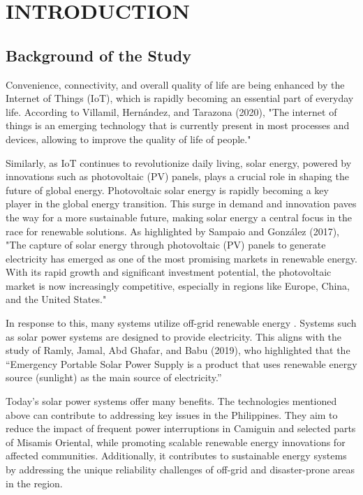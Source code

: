 \chapter{INTRODUCTION}

{\baselineskip


\section{Background of the Study}

Convenience, connectivity, and overall quality of life are being enhanced by the Internet of Things (IoT), which is rapidly becoming an essential part of everyday life. According to Villamil, Hernández, and Tarazona (2020), "The internet of things is an emerging technology that is currently present in most processes and devices, allowing to improve the quality of life of people."   

Similarly, as IoT continues to revolutionize daily living, solar energy, powered by innovations such as photovoltaic (PV) panels, plays a crucial role in shaping the future of global energy. Photovoltaic solar energy is rapidly becoming a key player in the global energy transition. This surge in demand and innovation paves the way for a more sustainable future, making solar energy a central focus in the race for renewable solutions. As highlighted by Sampaio and González (2017), "The capture of solar energy through photovoltaic (PV) panels to generate electricity has emerged as one of the most promising markets in renewable energy. With its rapid growth and significant investment potential, the photovoltaic market is now increasingly competitive, especially in regions like Europe, China, and the United States."

In response to this, many systems utilize off-grid renewable energy . Systems such as solar power systems are designed to provide electricity. This aligns with the study of Ramly, Jamal, Abd Ghafar, and Babu (2019), who highlighted that the “Emergency Portable Solar Power Supply is a product that uses renewable energy source (sunlight) as the main source of electricity.”

Today's solar power systems offer many benefits. The technologies mentioned above can contribute to addressing key issues in the Philippines. They aim to reduce the impact of frequent power interruptions in Camiguin and selected parts of Misamis Oriental, while promoting scalable renewable energy innovations for affected communities. Additionally, it contributes to sustainable energy systems by addressing the unique reliability challenges of off-grid and disaster-prone areas in the region.

}
